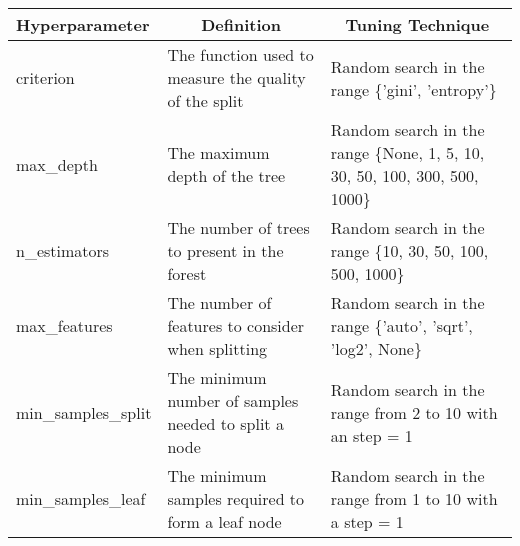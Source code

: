 \begin{table}[H]
\centering
\begin{tabularx}{0.8\textwidth}{l|X|X}
\hline
\textbf{Hyperparameter} & \multicolumn{1}{c|}{\textbf{Definition}}              & \multicolumn{1}{c}{\textbf{Tuning Technique}}                             \\ \hline
criterion               & The function used to measure the quality of the split & Random search in the range \{'gini', 'entropy'\}                           \\ \hline
max\_depth              & The maximum depth of the tree                         & Random search in the range \{None, 1, 5, 10, 30, 50, 100, 300, 500, 1000\} \\ \hline
n\_estimators           & The number of trees to present in the forest          & Random search in the range \{10, 30, 50, 100, 500, 1000\}                  \\ \hline
max\_features           & The number of features to consider when splitting     & Random search in the range \{'auto', 'sqrt', 'log2', None\}                \\ \hline
min\_samples\_split     & The minimum number of samples needed to split a node  & Random search in the range from 2 to 10 with an step = 1                   \\ \hline
min\_samples\_leaf      & The minimum samples required to form a leaf node      & Random search in the range from 1 to 10 with a step = 1                    \\ \hline
\end{tabularx}
\end{table}